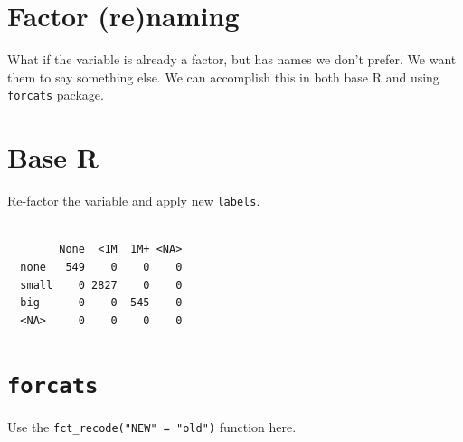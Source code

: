 \documentclass[
  letterpaper,
  DIV=11,
  numbers=noendperiod,
  oneside]{scrreprt}
\newenvironment{Shaded}{\begin{snugshade}}{\end{snugshade}}
\newcommand{\AttributeTok}[1]{\textcolor[rgb]{0.40,0.45,0.13}{#1}}
\newcommand{\FunctionTok}[1]{\textcolor[rgb]{0.28,0.35,0.67}{#1}}
\newcommand{\NormalTok}[1]{\textcolor[rgb]{0.00,0.23,0.31}{#1}}
\newcommand{\OtherTok}[1]{\textcolor[rgb]{0.00,0.23,0.31}{#1}}
\newcommand{\SpecialCharTok}[1]{\textcolor[rgb]{0.37,0.37,0.37}{#1}}
\newcommand{\StringTok}[1]{\textcolor[rgb]{0.13,0.47,0.30}{#1}}
\begin{document}
\section{Factor (re)naming}\label{factor-renaming}

What if the variable is already a factor, but has names we don't prefer.
We want them to say something else. We can accomplish this in both base
R and using \texttt{forcats} package.

\section{Base R}

Re-factor the variable and apply new \texttt{labels}.

\begin{Shaded}
\end{Shaded}

\begin{verbatim}
       
        None  <1M  1M+ <NA>
  none   549    0    0    0
  small    0 2827    0    0
  big      0    0  545    0
  <NA>     0    0    0    0
\end{verbatim}

\section{\texorpdfstring{\texttt{forcats}}{forcats}}

Use the \texttt{fct\_recode("NEW"\ =\ "old")} function here.

\begin{Shaded}
\end{Shaded}
\end{document}
